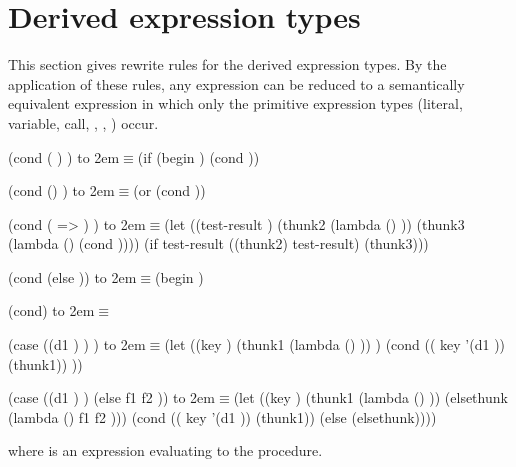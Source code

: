 \section{Derived expression types}
\label{derivedsection}

This section gives rewrite rules for the derived expression types.  By
the application of these rules, any expression can be reduced to a
semantically equivalent expression in which only the primitive
expression types (literal, variable, call, , ,
) occur.


\newcommand{\iet}{\hbox to 2em{\hfil $\equiv$}}  %

\begin{schemenoindent}
(cond ( )
       \dotsfoo)
\iet  (if 
          (begin )
          (cond  \dotsfoo))

(cond ()
       \dotsfoo)
\iet  (or  (cond  \dotsfoo))

(cond ( => )
       \dotsfoo)
\iet  (let ((test-result )
            (thunk2 (lambda () ))
            (thunk3 (lambda () (cond  \dotsfoo))))
        (if test-result
            ((thunk2) test-result)
            (thunk3)))

(cond (else ))
\iet  (begin )

(cond)
\iet  {}

(case  
  ((d1 \dotsfoo) )
  \dotsfoo)
\iet  (let ((key )
            (thunk1 (lambda () ))
            \dotsfoo)
        (cond (( key '(d1 \dotsfoo)) (thunk1))
               \dotsfoo))

(case  
  ((d1 \dotsfoo) )
  \dotsfoo
  (else f1 f2 \dotsfoo))
\iet  (let ((key )
            (thunk1 (lambda () ))
            \dotsfoo
            (elsethunk (lambda () f1 f2 \dotsfoo)))
        (cond (( key '(d1 \dotsfoo)) (thunk1))
               \dotsfoo
              (else (elsethunk))))%
\end{schemenoindent}
where  is an expression evaluating to the  procedure.

